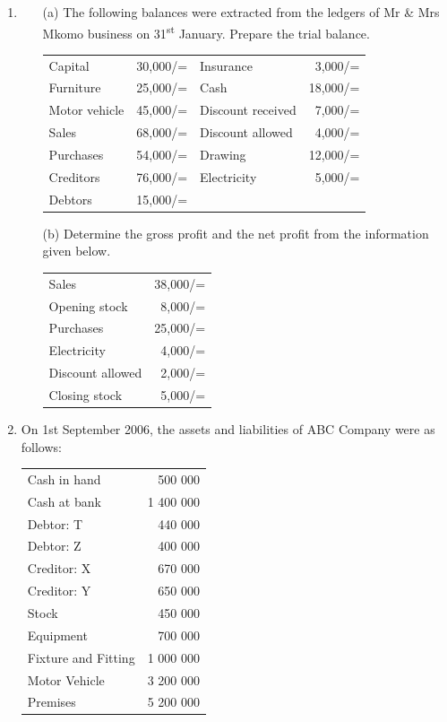 \begin{enumerate}
	\item 
		\begin{itemize}
		\item[(a)] The following balances were extracted from the ledgers of Mr \& Mrs Mkomo business on 31\textsuperscript{st} January. Prepare the trial balance.\\
		\begin{tabular}{l r l r}
		Capital&30,000/=&Insurance&3,000/=	\\
		Furniture&25,000/=&Cash&18,000/=	\\
		Motor vehicle&45,000/=&Discount received&7,000/=	\\
		Sales&68,000/=&Discount allowed&4,000/=	\\
		Purchases&54,000/=&Drawing&12,000/=	\\
		Creditors&76,000/=&Electricity&5,000/=	\\
		Debtors&15,000/=&&	\\
		\end{tabular}
		\item[(b)] Determine the gross profit and the net profit from the information given below.\\
		\begin{tabular}{l r}
		Sales&38,000/= \\
		Opening stock&8,000/= \\
		Purchases&25,000/= \\
		Electricity&4,000/= \\
		Discount allowed&2,000/= \\
		Closing stock&5,000/= \\
		\end{tabular}
		\end{itemize}


	\item On 1st September 2006, the assets and liabilities of ABC Company were as follows:\\

\begin{tabular}{l r}
Cash in hand & 500 000\\
Cash at bank & 1 400 000\\
Debtor: T & 440 000\\
Debtor: Z & 400 000\\
Creditor: X & 670 000\\
Creditor: Y & 650 000\\
Stock & 450 000\\
Equipment & 700 000\\
Fixture and Fitting & 1 000 000\\
Motor Vehicle & 3 200 000\\
Premises & 5 200 000\\
\end{tabular}\\


\end{enumerate}
